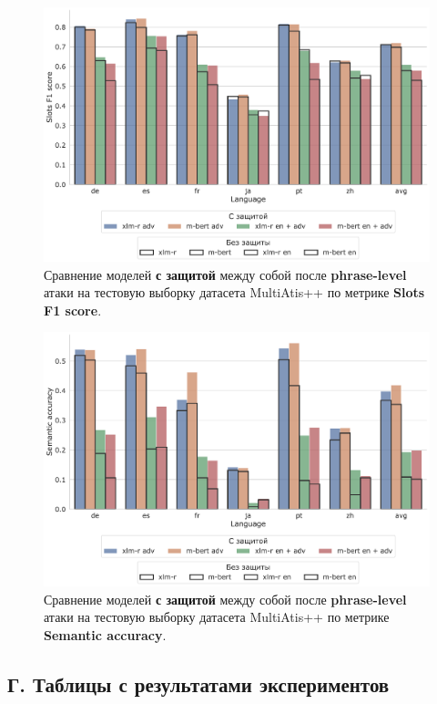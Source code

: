 \begin{figure}[h!]
    \centering
    \includegraphics[width=\textwidth]{images/16}
    \caption{Сравнение моделей \textbf{с защитой} между собой после \textbf{phrase-level} атаки на тестовую выборку датасета MultiAtis++ по метрике \textbf{Slots F1 score}.}\label{fig:figure16}
\end{figure}
\begin{figure}[h!]
    \centering
    \includegraphics[width=\textwidth]{images/17}
    \caption{Сравнение моделей \textbf{с защитой} между собой после \textbf{phrase-level} атаки на тестовую выборку датасета MultiAtis++ по метрике \textbf{Semantic accuracy}.}\label{fig:figure17}
\end{figure}

\subsection*{Г. Таблицы с результатами экспериментов}








